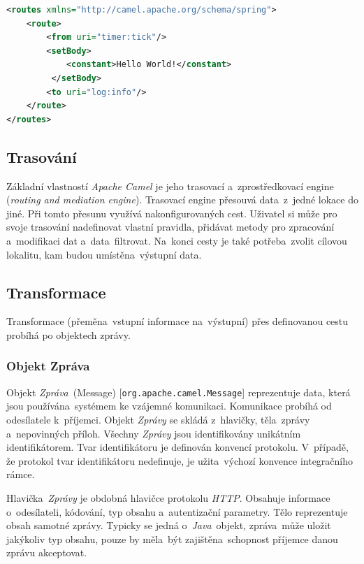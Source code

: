\begin{lstlisting}[language=XML, label={lst:apachecamel-springdsl-ukazka}, caption=Ukázka~syntaxe pro \emph{Spring DSL}.]
<routes xmlns="http://camel.apache.org/schema/spring">
    <route>
        <from uri="timer:tick"/>
        <setBody>
            <constant>Hello World!</constant>
         </setBody>
        <to uri="log:info"/>
    </route>
</routes>
\end{lstlisting}

\subsection{Trasování}
\label{camelTrasovani}
Základní vlastností \emph{Apache Camel} je jeho trasovací a~zprostředkovací engine (\emph{routing and mediation engine}). Trasovací engine přesouvá data~z~jedné lokace do jiné. Při tomto přesunu využívá nakonfigurovaných cest. Uživatel si může pro svoje trasování nadefinovat vlastní pravidla, přidávat metody pro zpracování a~modifikaci dat a~data~filtrovat. Na~konci cesty je také potřeba~zvolit cílovou lokalitu, kam budou umístěna~výstupní data.

\subsection{Transformace}
\label{camelTransformace}
Transformace (přeměna~vstupní informace na~výstupní) přes definovanou cestu probíhá po objektech zprávy. 
 
\subsubsection{Objekt Zpráva}
\label{camelObjZprava}
Objekt \emph{Zpráva}~(Message) [\texttt{org.apache.camel.Message}] reprezentuje data, která jsou používána~systémem ke vzájemné komunikaci. Komunikace probíhá od odesílatele k~příjemci. Objekt \emph{Zprávy} se skládá z~hlavičky, těla~zprávy a~nepovinných příloh. Všechny \emph{Zprávy} jsou identifikovány unikátním identifikátorem. Tvar identifikátoru je definován konvencí protokolu. V~případě, že protokol tvar identifikátoru nedefinuje, je užita~výchozí konvence integračního rámce. 

Hlavička~\emph{Zprávy} je obdobná hlavičce protokolu \emph{HTTP}. Obsahuje informace o~odesílateli, kódování, typ obsahu a~autentizační parametry. Tělo reprezentuje obsah samotné zprávy. Typicky se jedná o~\emph{Java}~objekt, zpráva~může uložit jakýkoliv typ obsahu, pouze by měla~být zajištěna~schopnost příjemce danou zprávu akceptovat.

